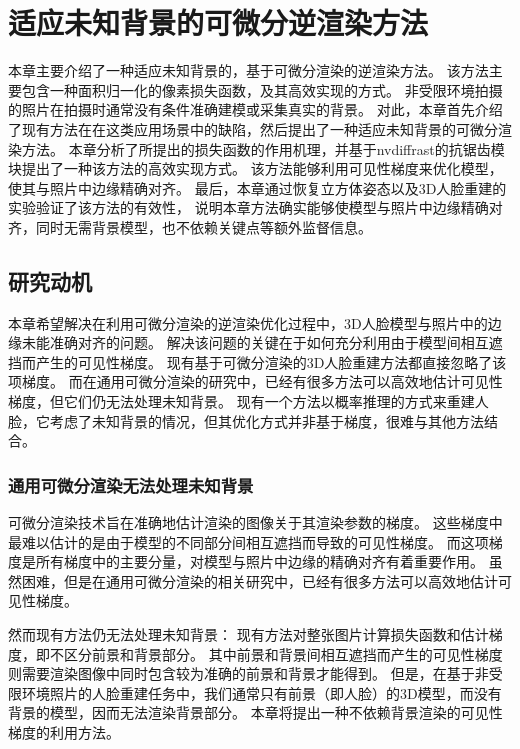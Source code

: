 \chapter{适应未知背景的可微分逆渲染方法}
\label{chap:method}

本章主要介绍了一种适应未知背景的，基于可微分渲染的逆渲染方法。
该方法主要包含一种面积归一化的像素损失函数，及其高效实现的方式。
非受限环境拍摄的照片在拍摄时通常没有条件准确建模或采集真实的背景。
对此，本章首先介绍了现有方法在在这类应用场景中的缺陷，然后提出了一种适应未知背景的可微分渲染方法。
本章分析了所提出的损失函数的作用机理，并基于nvdiffrast的抗锯齿模块提出了一种该方法的高效实现方式。
该方法能够利用可见性梯度来优化模型，使其与照片中边缘精确对齐。
最后，本章通过恢复立方体姿态以及3D人脸重建的实验验证了该方法的有效性，
说明本章方法确实能够使模型与照片中边缘精确对齐，同时无需背景模型，也不依赖关键点等额外监督信息。

\section{研究动机}

本章希望解决在利用可微分渲染的逆渲染优化过程中，3D人脸模型与照片中的边缘未能准确对齐的问题。
解决该问题的关键在于如何充分利用由于模型间相互遮挡而产生的可见性梯度。
现有基于可微分渲染的3D人脸重建方法都直接忽略了该项梯度。
而在通用可微分渲染的研究中，已经有很多方法可以高效地估计可见性梯度，但它们仍无法处理未知背景。
现有一个方法\citep{SchonbornEFV15}以概率推理的方式来重建人脸，它考虑了未知背景的情况，但其优化方式并非基于梯度，很难与其他方法结合。

\subsection{通用可微分渲染无法处理未知背景}

可微分渲染技术旨在准确地估计渲染的图像关于其渲染参数的梯度。
这些梯度中最难以估计的是由于模型的不同部分间相互遮挡而导致的可见性梯度。
而这项梯度是所有梯度中的主要分量，对模型与照片中边缘的精确对齐有着重要作用。
虽然困难，但是在通用可微分渲染的相关研究中，已经有很多方法可以高效地估计可见性梯度。

然而现有方法仍无法处理未知背景：
现有方法对整张图片计算损失函数和估计梯度，即不区分前景和背景部分。
其中前景和背景间相互遮挡而产生的可见性梯度则需要渲染图像中同时包含较为准确的前景和背景才能得到。
但是，在基于非受限环境照片的人脸重建任务中，我们通常只有前景（即人脸）的3D模型，而没有背景的模型，因而无法渲染背景部分。
本章将提出一种不依赖背景渲染的可见性梯度的利用方法。

